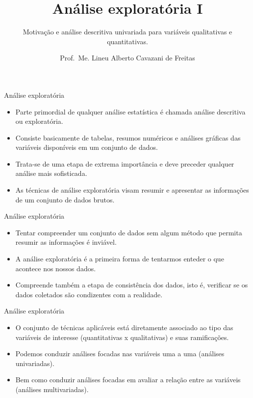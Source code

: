 \documentclass[
  ignorenonframetext,
  serif,
  professionalfont,
  usenames,
  dvipsnames,
  aspectratio = 169]{beamer}
\title{\textbf{Análise exploratória I}}
\subtitle{Motivação e análise descritiva univariada para variáveis
qualitativas e quantitativas.}
\author{Prof.~Me. Lineu Alberto Cavazani de Freitas}
\date{}
\institute{\textbf{CE003 – Estatística II}\\
\strut \\
Departamento de Estatística\\
Laboratório de Estatística e Geoinformação}
\begin{document}
\frame{\titlepage}

\begin{frame}{Análise exploratória}
\protect\hypertarget{anuxe1lise-exploratuxf3ria}{}
\begin{itemize}
\item
  Parte primordial de qualquer análise estatística é chamada análise
  descritiva ou exploratória.
\item
  Consiste basicamente de tabelas, resumos numéricos e análises gráficas
  das variáveis disponíveis em um conjunto de dados.
\item
  Trata-se de uma etapa de extrema importância e deve preceder qualquer
  análise mais sofisticada.
\item
  As técnicas de análise exploratória visam resumir e apresentar as
  informações de um conjunto de dados brutos.
\end{itemize}
\end{frame}

\begin{frame}{Análise exploratória}
\protect\hypertarget{anuxe1lise-exploratuxf3ria-1}{}
\begin{itemize}
\item
  Tentar compreender um conjunto de dados sem algum método que permita
  resumir as informações é inviável.
\item
  A análise exploratória é a primeira forma de tentarmos enteder o que
  acontece nos nossos dados.
\item
  Compreende também a etapa de consistência dos dados, isto é, verificar
  se os dados coletados são condizentes com a realidade.
\end{itemize}
\end{frame}

\begin{frame}{Análise exploratória}
\protect\hypertarget{anuxe1lise-exploratuxf3ria-2}{}
\begin{itemize}
\item
  O conjunto de técnicas aplicáveis está diretamente associado ao tipo
  das variáveis de interesse (quantitativas x qualitativas) e suas
  ramificações.
\item
  Podemos conduzir análises focadas nas variáveis uma a uma (análises
  univariadas).
\item
  Bem como conduzir análises focadas em avaliar a relação entre as
  variáveis (análises multivariadas).
\end{itemize}
\end{frame}
\end{document}

